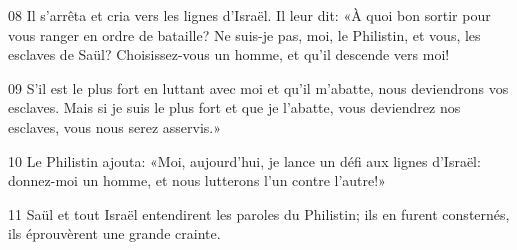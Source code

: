 
08 Il s’arrêta et cria vers les lignes d’Israël. Il leur dit: «À quoi bon sortir pour vous ranger en ordre de bataille? Ne suis-je pas, moi, le Philistin, et vous, les esclaves de Saül? Choisissez-vous un homme, et qu’il descende vers moi!

09 S’il est le plus fort en luttant avec moi et qu’il m’abatte, nous deviendrons vos esclaves. Mais si je suis le plus fort et que je l’abatte, vous deviendrez nos esclaves, vous nous serez asservis.»

10 Le Philistin ajouta: «Moi, aujourd’hui, je lance un défi aux lignes d’Israël: donnez-moi un homme, et nous lutterons l’un contre l’autre!»

11 Saül et tout Israël entendirent les paroles du Philistin; ils en furent consternés, ils éprouvèrent une grande crainte.
